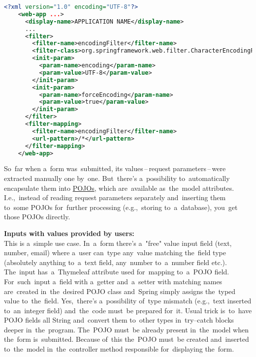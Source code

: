 \begin{lstlisting}[language=XML, title=Example of a~\textit{web.xml} file with encoding filter configuration]
    <?xml version="1.0" encoding="UTF-8"?>
    <web-app ...>
      <display-name>APPLICATION NAME</display-name>
      ...
      <filter>
        <filter-name>encodingFilter</filter-name>
        <filter-class>org.springframework.web.filter.CharacterEncodingFilter </filter-class>
        <init-param>
          <param-name>encoding</param-name>
          <param-value>UTF-8</param-value>
        </init-param>
        <init-param>
          <param-name>forceEncoding</param-name>
          <param-value>true</param-value>
        </init-param>
      </filter>
      <filter-mapping>
        <filter-name>encodingFilter</filter-name>
        <url-pattern>/*</url-pattern>
      </filter-mapping>
    </web-app>
\end{lstlisting}
\newpage

So~far when a~form was~submitted, its values\,--\,request parameters\,--\,were extracted manually one by~one.
But~there's a~possibility to~automatically encapsulate them into \hyperref[pojo]{POJOs}, which are~available as~the~model attributes.
I.e.,~instead of reading request parameters separately and~inserting them to~some POJOs for~further processing (e.g.,~storing to~a~database), you~get those POJOs directly.
\newline

\noindent \textbf{Inputs with values provided by users:}\\
\noindent This is a~simple use case.
In~a~form there's a~"free" value input field (text, number, email) where a~user can~type any~value matching the~field type (absolutely anything to~a~text field, any~number to~a~number field etc.).
The~input has~a~Thymeleaf attribute  used for~mapping to~a~POJO field.
For~such~input a~field with a~getter and~a~setter with matching names are~created in~the~desired POJO class and~Spring simply assigns the~typed value to~the~field.
Yes,~there's a~possibility of~type mismatch (e.g.,~text inserted to~an~integer field) and~the~code must~be prepared for~it.
Usual trick is~to~have POJO fields all String and~convert them to~other types in~try--catch blocks deeper in~the~program.
The~POJO must~be already present in~the~model when the~form is~submitted.
Because of~this the~POJO must~be created and~inserted to~the~model in~the~controller method responsible for~displaying the~form.
\newline

